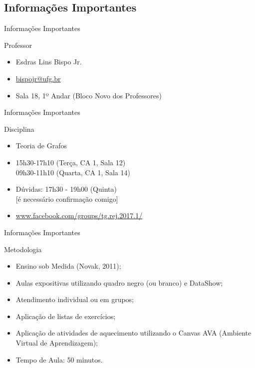 \documentclass[xcolor=dvipsnames,table]{beamer}
\begin{document}
	\subsection{Informações Importantes}
	\begin{frame}{Informações Importantes}
		\begin{block}{Professor}
			\begin{itemize}
				\item Esdras Lins Bispo Jr.
				\item \url{bispojr@ufg.br}
				\item Sala 18, 1º Andar (Bloco Novo dos Professores)
			\end{itemize}
		\end{block}
	\end{frame}	
	
	\begin{frame}{Informações Importantes}
		\begin{block}{Disciplina}
			\begin{itemize}
				\item Teoria de Grafos
				\item 15h30-17h10 (Terça, CA 1, Sala 12)\\
				09h30-11h10 (Quarta, CA 1, Sala 14)
				\item Dúvidas: 17h30 - 19h00 (Quinta)\\
				{\color{red}[é necessário confirmação comigo]}
				\item \url{www.facebook.com/groups/tg.rej.2017.1/}
			\end{itemize}
		\end{block}
	\end{frame}
	
	\begin{frame}{Informações Importantes}
		\begin{block}{Metodologia}
			\begin{itemize}
				\item Ensino sob Medida (Novak, 2011);
				\item Aulas expositivas utilizando quadro negro (ou branco) e DataShow;
				\item Atendimento individual ou em grupos;
				\item Aplicação de listas de exercícios;
				\item Aplicação de atividades de aquecimento utilizando o 
				Canvas AVA (Ambiente Virtual de Aprendizagem);
				\item Tempo de Aula: 50 minutos.
			\end{itemize}
		\end{block}
	\end{frame}
	
\end{document}
